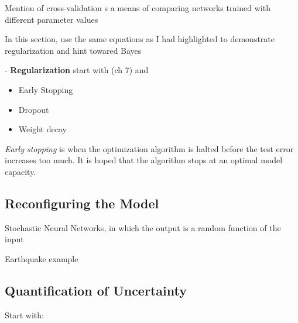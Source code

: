 Mention of cross-validation s a means of comparing networks trained with different parameter values \cite{mackay1992practical}

In this section, use the same equations as I had highlighted to demonstrate regularization and hint towared Bayes


- \textbf{Regularization} start with \cite{Goodfellow-et-al-2016} (ch 7) and \cite{nusrat2018comparison}

\begin{itemize}
    \item
Early Stopping
    \item
Dropout
    \item
Weight decay
\end{itemize}

\textit{Early stopping} is when the optimization algorithm is halted before the test error increases too much.  It is hoped that the algorithm stops at an optimal model capacity.

\subsection{Reconfiguring the Model}

Stochastic Neural Networks, in which the output is a random function of the input \cite{arxiv_stochast}

Earthquake example


\subsection{Quantification of Uncertainty}
 Start with:
\cite{8371683}
\cite{arxiv.1505.05424}